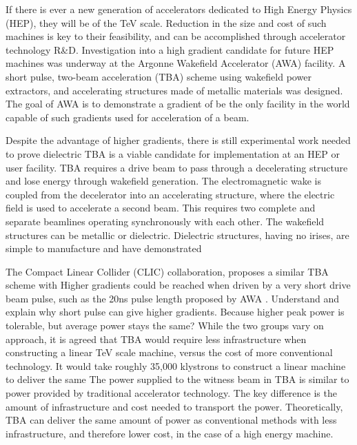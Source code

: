 \documentclass{iitthesis}
\newcommand{\nrnote}[1]{\textsf{{\color{blue}{ NN note:}   #1 }}}
\begin{document}
 \label{sec:motivation}

If there is ever a new generation of accelerators dedicated to High Energy Physics
(HEP), they will be of the TeV scale. Reduction in the size and cost
of such machines is key to their feasibility, and can be accomplished
through accelerator technology R\&D. Investigation into a 
high gradient candidate for future HEP machines was underway
at the Argonne Wakefield Accelerator (AWA) facility. A
short pulse, two-beam acceleration (TBA) scheme using 
wakefield power extractors, and accelerating structures made 
of metallic materials was designed. 
The goal of AWA is to demonstrate a gradient of
be the only facility in the world capable of such gradients used for
acceleration of a beam.

Despite the advantage of higher gradients, there is still experimental work
needed to prove dielectric TBA is a viable candidate for implementation at an HEP or user facility.
TBA requires a drive beam to pass through a decelerating structure and
lose energy through wakefield generation. The electromagnetic wake
is coupled from the decelerator into an accelerating structure, where
the electric field is used to accelerate a second beam. This requires
two complete and separate beamlines operating synchronously with each other.  
The wakefield structures can be metallic or dielectric. Dielectric
structures, having no irises, are simple to manufacture and have demonstrated

The Compact Linear Collider (CLIC) collaboration, proposes a similar TBA scheme with
Higher gradients could be reached when driven by a very short drive
beam pulse, such as the 20ns pulse length proposed by AWA \cite{WeiPaper}. 
\nrnote{Understand and explain why short pulse can give higher gradients. 
Because higher peak power is tolerable, but average power stays the same?}
While the two groups vary on approach, it is agreed that TBA would 
require less infrastructure when constructing a linear TeV scale machine, 
versus the cost of more conventional technology. 
It would take roughly 35,000 klystrons to construct a linear machine to deliver the same 
The power supplied to the witness beam in TBA is similar to
power provided by traditional accelerator technology. 
The key difference is the amount of infrastructure and cost 
needed to transport the power. Theoretically, TBA can deliver
the same amount of power as conventional methods with less 
infrastructure, and therefore lower cost, in the case of a high energy machine. 
\end{document}
